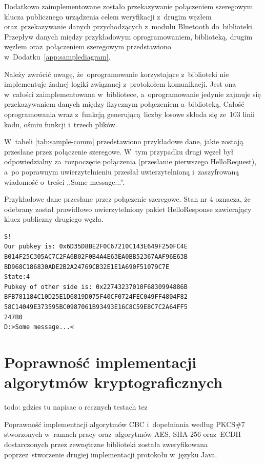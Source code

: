 Dodatkowo zaimplementowane zostało przekazywanie połączeniem szeregowym klucza publicznego urządzenia celem weryfikacji z~drugim węzłem oraz~przekazywanie danych przychodzących z~modułu Bluetooth do~biblioteki. Przepływ danych między przykładowym oprogramowaniem, biblioteką, drugim węzłem oraz~połączeniem szeregowym przedstawiono w~Dodatku~\ref{app:samplediagram}.

Należy zwrócić uwagę, że~oprogramowanie korzystające z~biblioteki nie implementuje żadnej logiki związanej z~protokołem komunikacji. Jest ona w~całości zaimplementowana w~bibliotece, a~oprogramowanie jedynie zajmuje się przekazywaniem danych między fizycznym połączeniem a~biblioteką. Całość oprogramowania wraz z~funkcją generującą liczby losowe składa się ze~103 linii kodu, ośmiu funkcji i~trzech plików.

W~tabeli \ref{tab:sample-comm} przedstawiono przykładowe dane, jakie zostają przesłane przez połączenie szeregowe. W~tym przypadku drugi węzeł był odpowiedzialny za~rozpoczęcie połączenia (przesłanie pierwszego HelloRequest), a~po poprawnym uwierzytelnieniu przesłał uwierzytelnioną i~zaszyfrowaną wiadomość o~treści ,,Some message...''.

\begin{table}
\centering
\caption{Przykładowe dane przesłane przez połączenie szeregowe. Stan nr 4 oznacza, że odebrany został prawidłowo uwierzytelniony pakiet HelloResponse zawierający klucz publiczny drugiego węzła.}
\begin{BVerbatim}
S!
Our pubkey is: 0x6D35D8BE2F0C67210C143E649F250FC4E
B014F25C305AC7C2FA6B02F0B4A4E63EA0BB52367AAF96E63B
BD968C186830ADE2B2A24769CB32E1E1A690F51079C7E
State:4
Pubkey of other side is: 0x22743237010F6830994886B
BFB781184C10D25E1D6819D075F40CF0724FEC049FF4804F82
58C14049E373595BC0987061B93493E16C8C59E8C7C2A64FF5
247B0
D:>Some message...<
\end{BVerbatim}
\label{tab:sample-comm}
\end{table}

\section{Poprawność implementacji algorytmów kryptograficznych}

todo: gdzies tu napisac o recznych testach tez

Poprawność implementacji algorytmów CBC i~dopełniania według PKCS\#7 stworzonych w~ramach pracy oraz~algorytmów AES, SHA-256 oraz~ECDH dostarczonych przez zewnętrzne biblioteki została zweryfikowana poprzez~stworzenie drugiej implementacji protokołu w~języku Java.

